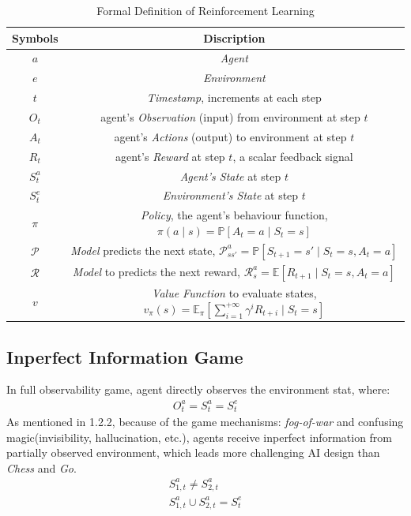 \documentclass[sigconf]{acmart}
\begin{document}
\begin{table}[htb]
\caption{Formal Definition of Reinforcement Learning\cite{David_Silver:intro_RL}}
\centering
\begin{tabular}{c c} %
\hline Symbols & Discription \\[0ex] \hline
$a$ & \emph{Agent}\\
$e$ & \emph{Environment}\\
$t$ & \emph{Timestamp}, increments at each step\\
$O_t$ & agent's \emph{Observation} (input) from environment at step $t$\\
$A_t$ & agent's \emph{Actions} (output) to environment at step $t$\\
$R_t$ & agent's \emph{Reward} at step $t$, a scalar feedback signal\\
$S_t^a$ & \emph{Agent's State} at step $t$\\
$S_t^e$ & \emph{Environment's State} at step $t$\\
$\pi$ & \emph{Policy}, the agent's behaviour function, $\pi(a \mid s)=\mathbb{P}[A_t=a \mid S_t = s]$\\
$\mathcal{P}$ & \emph{Model} predicts the next state, $\mathcal{P}_{ss'}^a =\mathbb{P}[S_{t+1}=s' \mid S_t=s, A_t=a]$\\
$\mathcal{R}$ & \emph{Model} to predicts the next reward, $\mathcal{R}_{s}^a =\mathbb{E}[R_{t+1} \mid S_t=s, A_t=a]$\\
$v$ & \emph{Value Function} to evaluate states, $v_\pi(s)=\mathbb{E}_\pi[\sum_{i=1}^{+\infty}\gamma^{i}R_{t+i} \mid S_t=s]$\\
\end{tabular}
\label{table:formal_definition_of_RL}
\end{table}

\subsection{Inperfect Information Game}
In full observability game, agent directly observes the environment stat, where:
\begin{eqnarray}
O_{t}^a=S_{t}^a=S_{t}^e
\end{eqnarray}
As mentioned in 1.2.2, because of the game mechanisms: \emph{fog-of-war} and confusing magic(invisibility, hallucination, etc.), agents receive inperfect information from partially observed environment, which leads more challenging AI design than \emph{Chess} and \emph{Go}.
\begin{eqnarray}
S_{1,t}^{a} \neq S_{2,t}^{a}\\
S_{1,t}^{a} \cup S_{2,t}^{a} = S_t^e
\end{eqnarray}
\end{document}
